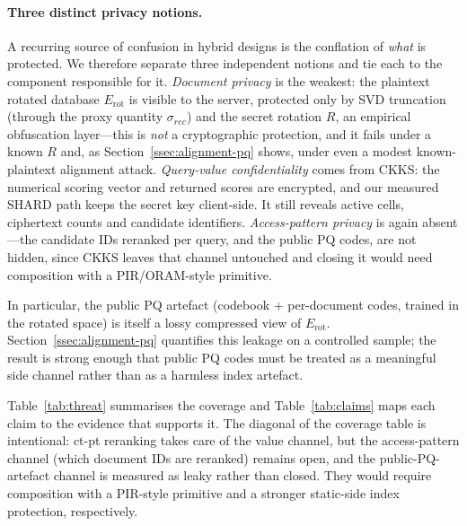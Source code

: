 \documentclass[11pt,a4paper]{article}
\begin{document}
\paragraph{Three distinct privacy notions.} A recurring source of
confusion in hybrid designs is the conflation of \emph{what} is
protected. We therefore separate three independent notions and tie each to the
component responsible for it. \emph{Document privacy} is the weakest: the
plaintext rotated database $E_{\mathrm{rot}}$ is visible to the server,
protected only by SVD truncation (through the proxy quantity $\sigma_{rec}$)
and the secret rotation $R$, an empirical obfuscation layer---this is
\emph{not} a cryptographic protection, and it fails under a known $R$ and, as
Section~\ref{ssec:alignment-pq} shows, under even a modest known-plaintext
alignment attack. \emph{Query-value confidentiality} comes from CKKS: the
numerical scoring vector and returned scores are encrypted, and our measured
SHARD path keeps the secret key client-side. It still reveals active cells,
ciphertext counts and candidate identifiers. \emph{Access-pattern
privacy} is again absent---the candidate IDs reranked per query, and the
public PQ codes, are not hidden, since CKKS leaves that channel untouched and
closing it would need composition with a PIR/ORAM-style primitive.

In particular, the public PQ artefact (codebook + per-document codes,
trained in the rotated space) is itself a lossy compressed view of
$E_{\mathrm{rot}}$. Section~\ref{ssec:alignment-pq} quantifies this
leakage on a controlled sample; the result is strong enough that public
PQ codes must be treated as a meaningful side channel rather than as a
harmless index artefact.

Table~\ref{tab:threat} summarises the coverage and
Table~\ref{tab:claims} maps each claim to the evidence that supports it.
The diagonal of the coverage table is intentional: ct-pt reranking takes
care of the value channel, but the access-pattern channel (which document
IDs are reranked) remains open, and the public-PQ-artefact channel is
measured as leaky rather than closed. They would require composition with
a PIR-style primitive and a stronger static-side index protection,
respectively.
\end{document}
